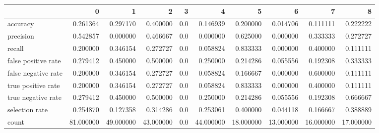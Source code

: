 \begin{tabular}{lrrrrrrrrr}
\toprule
{} &          0 &          1 &          2 &    3 &          4 &          5 &          6 &          7 &          8 \\
\midrule
accuracy            &   0.261364 &   0.297170 &   0.400000 &  0.0 &   0.146939 &   0.200000 &   0.014706 &   0.111111 &   0.222222 \\
precision           &   0.542857 &   0.000000 &   0.466667 &  0.0 &   0.000000 &   0.625000 &   0.000000 &   0.333333 &   0.272727 \\
recall              &   0.200000 &   0.346154 &   0.272727 &  0.0 &   0.058824 &   0.833333 &   0.000000 &   0.400000 &   0.111111 \\
false positive rate &   0.279412 &   0.450000 &   0.500000 &  0.0 &   0.250000 &   0.214286 &   0.055556 &   0.192308 &   0.333333 \\
false negative rate &   0.200000 &   0.346154 &   0.272727 &  0.0 &   0.058824 &   0.166667 &   0.000000 &   0.600000 &   0.111111 \\
true positive rate  &   0.200000 &   0.346154 &   0.272727 &  0.0 &   0.058824 &   0.833333 &   0.000000 &   0.400000 &   0.111111 \\
true negative rate  &   0.279412 &   0.450000 &   0.500000 &  0.0 &   0.250000 &   0.214286 &   0.055556 &   0.192308 &   0.666667 \\
selection rate      &   0.254870 &   0.127358 &   0.314286 &  0.0 &   0.253061 &   0.400000 &   0.044118 &   0.166667 &   0.388889 \\
count               &  81.000000 &  49.000000 &  43.000000 &  0.0 &  44.000000 &  18.000000 &  13.000000 &  16.000000 &  17.000000 \\
\bottomrule
\end{tabular}
